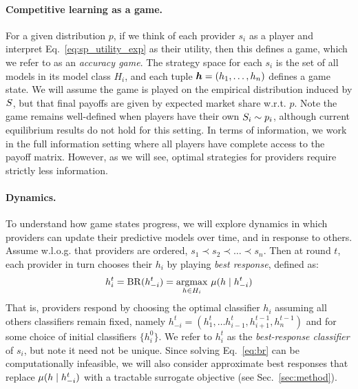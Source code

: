 \paragraph{Competitive learning as a game.}
For a given distribution $p$,
if we think of each provider $s_i$ as a player and interpret Eq.~\eqref{eq:sp_utility_exp} as their utility, 
then this defines a game, which we refer to as an \emph{accuracy game}.
The strategy space for each $s_i$ is the set of all models in its model class $H_i$, and each tuple ${\bm{h}} = (h_1,\dots,h_n)$ defines a game state.
We will assume the game is played on 
the empirical distribution induced by ${S}$,
but that final payoffs are given by expected market share w.r.t. $p$.
Note the game remains well-defined when players have their own ${S}_i \sim p_i$, although current equilibrium results do not hold for this setting.
In terms of information, we work in the full information setting
where all players have complete access to the payoff matrix.
However, as we will see, 
optimal strategies for providers require strictly less information.


\paragraph{Dynamics.}
To understand how game states progress,
we will explore dynamics in which providers can update their predictive models over time,
and in response to others.
Assume w.l.o.g. that providers are ordered,
$s_1 \prec s_2 \prec \dots \prec s_n$.
Then at round $t$,
each provider in turn chooses their $h_i$ by playing \emph{best response}, defined as:
\begin{equation}
\label{eq:br}
h_i^{t} 
= \mathrm{BR}(h^{t}_{-i})
= \operatorname*{argmax}_{h \in H_i} \, \mu(h \mid h_{-i}^{t})
\end{equation}
That is, providers respond by choosing the optimal classifier $h_i$ assuming all others classifiers remain fixed,
namely $h_{-i}^t = (h_1^{t}, \dots h_{i-1}^{t}, h_{i+1}^{t-1}, h_n^{t-1})$ and for some choice of initial classifiers $\{h_i^0\}$.
We refer to $h_i^t$ as the \emph{best-response classifier} of $s_i$,
but note it need not be unique.
Since solving Eq.~\eqref{eq:br} can be computationally infeasible,
we will also consider approximate best responses that replace $\mu(h \mid h_{-i}^{t})$ with a tractable surrogate objective (see Sec.~\ref{sec:method}).

